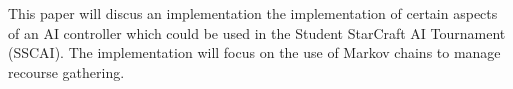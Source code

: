 This paper will discus an implementation the implementation of certain aspects of an AI controller which could be used in the Student StarCraft AI Tournament (SSCAI).\cite{sscai} The implementation will focus on the use of Markov chains to manage recourse gathering.